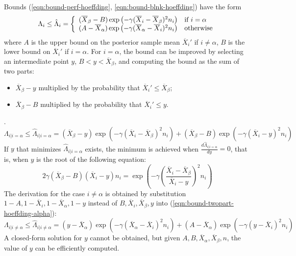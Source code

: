 \documentclass{article}
\begin{document}
Bounds (\ref{eqn:bound-perf-hoeffding}, \ref{eqn:bound-blnk-hoeffding}) have the form
\begin{equation}
  \Lambda_i \le \hat\Lambda_i=\left\{
  \begin{array}{l l}
    (\overline X_\beta-B)\exp\left(- \gamma(\overline X_i - \overline X_\beta)^2 n_i \right) & \mbox{{\rm if} $i=\alpha$} \\
    (A-\overline  X_\alpha)\exp\left(- \gamma(\overline X_\alpha - \overline X_i)^2 n_i \right)  &  \mbox{\rm otherwise}
  \end{array} \right.
\label{eqn:bound-generic-hoeffding}
\end{equation}
where $A$ is the upper bound on the posterior sample mean $\overline
X_i'$ if $i\ne \alpha$, $B$ is the lower bound on $\overline X_i'$ if
$i=\alpha$. For $i=\alpha$, the bound can be improved by selecting an
intermediate point $y$, $B < y < \overline X_\beta$, and computing the bound
as the sum of two parts: 
\begin{itemize}
\item $\overline X_\beta-y$ multiplied by the probability that
  $\overline X_i' \le \overline X_\beta$;
\item $\overline X_\beta-B$ multiplied by the probability that $\overline X_i'\le
  y$.
\end{itemize}.
\begin{equation}
\Lambda_{i|i=\alpha} \le \hat \Lambda_{i|i=\alpha} =
 (\overline X_\beta-y)\exp\left(-\gamma (\overline X_i-\overline X_\beta)^2n_i\right)
 +(\overline X_\beta-B)\exp\left(-\gamma (\overline X_i-y)^2n_i\right)
\label{eqn:bound-twopart-hoeffding-alpha}
\end{equation}
If $y$ that minimizes $\hat\Lambda_{i|i=\alpha}$ exists, the minimum is achieved when
 $\frac {d\hat\Lambda_{i|i=\alpha}} {dy}=0$, that
is, when $y$ is the root of the following equation:
\begin{equation}
  2\gamma (\overline X_\beta-B)(\overline X_i-y)n_i = \exp\left(-\gamma \left(\frac {\overline X_i-\overline X_\beta}
    {\overline X_i-y}\right)^2n_i\right)
\end{equation}
The derivation for the case $i\ne \alpha$ is obtained by substitution $1-A, 1-\overline X_i, 1-\overline X_\alpha, 1-y$ instead of
$B, \overline X_i, \overline X_\beta, y$ into (\ref{eqn:bound-twopart-hoeffding-alpha}):
\begin{equation}
\Lambda_{i|i\ne\alpha} \le \hat\Lambda_{i|i\ne\alpha} = (y-\overline X_\alpha)\exp\left(-\gamma(\overline X_\alpha-\overline
  X_i)^2 n_i\right)+(A-\overline X_\alpha)\exp\left(-\gamma (y-\overline X_i)^2n_i\right)
\label{eqn:bound-twopart-hoeffding-rest}
\end{equation}
A closed-form solution for $y$ cannot be obtained, but given
$A, B, \overline X_\alpha, \overline X_\beta, n$, the value of $y$ can be efficiently
computed.



\end{document}
